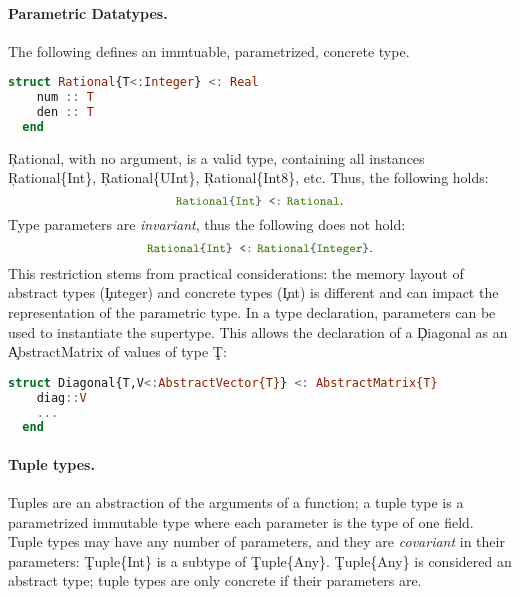 \paragraph{Parametric Datatypes.}
The following defines an immtuable, para\-metrized, concrete type.
\begin{lstlisting}[language=julia]
  struct Rational{T<:Integer} <: Real
    num :: T
    den :: T
  end
\end{lstlisting}
\noindent
\c{Rational}, with no argument, is a valid type, containing all instances
\c{Rational\{Int\}}, \c{Rational\{UInt\}}, \c{Rational\{Int8\}},
etc.  Thus, the following holds:
\[ \texttt{\small\color{jlbuiltin} Rational}   \texttt{\small\color{jlkeyword} \{}   \texttt{\small\color{jlbuiltin}\color{jlbuiltin} Int}   \texttt{\small\color{jlkeyword} \}\kern0pt}  \,\,\, \texttt{\small\color{jlkeyword} <:}\,\,   \texttt{\small\color{jlbuiltin} Rational}. \]
Type parameters are \emph{invariant}, thus the following does not hold:
\[ \texttt{\small\color{jlbuiltin} Rational}   \texttt{\small\color{jlkeyword} \{}   \texttt{\small\color{jlbuiltin}\color{jlbuiltin} Int}   \texttt{\small\color{jlkeyword} \}\kern0pt}  \,\,\, \texttt{\small\color{jlkeyword} <:}\,\,   \texttt{\small\color{jlbuiltin} Rational}   \texttt{\small\color{jlkeyword} \{}   \texttt{\small\color{jlbuiltin} Integer}   \texttt{\small\color{jlkeyword} \}\kern0pt}.\]
This restriction stems from
practical considerations: the memory layout of abstract types
(\c{Integer}) and concrete types (\c{Int}) is different and can impact
the representation of the parametric type.  In a type declaration,
parameters can be used to instantiate the supertype.  This allows the
declaration of a \c{Diagonal} as an
\c{AbstractMatrix} of values of type \c{T}:
\begin{lstlisting}[language=julia]
  struct Diagonal{T,V<:AbstractVector{T}} <: AbstractMatrix{T}
    diag::V
    ...
  end
\end{lstlisting}

\paragraph{Tuple types.}
Tuples are an abstraction of the arguments of a function; a tuple type is a
parametrized immutable type where each parameter is the type of one field.
Tuple types may have any number of parameters, and they are \emph{covariant}
in their parameters: \c{Tuple\{Int\}} is a subtype of \c{Tuple\{Any\}}.
\c{Tuple\{Any\}} is considered an abstract type; tuple types are only
concrete if their parameters are.

